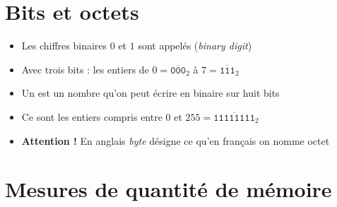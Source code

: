 \section{Bits et octets}


\begin{frame}


\begin{itemize}
  \item<2-> Les chiffres binaires $0$ et $1$ sont appelés  (\emph{binary digit})
  
  \item<3-> Avec trois bits : les entiers de $0=\overline{\mathtt{000}}_2$ 
  à $7=\overline{\mathtt{111}}_2$
  
  \item<4-> Un  est un nombre qu'on peut écrire en binaire sur huit
bits

  \item<5-> Ce sont les entiers compris entre $0$ et $255=\overline{\mathtt{11111111}}_2$

  \item<6-> \textbf{Attention \!!} En anglais \emph{byte} désigne ce qu'en français on nomme octet
\end{itemize}

\end{frame}


\section{Mesures de quantité de mémoire}


